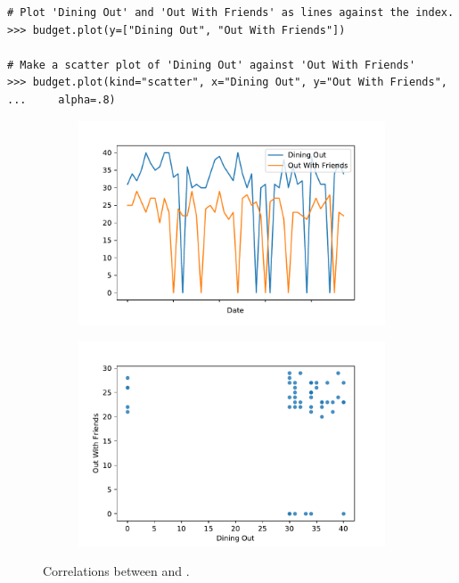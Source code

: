 \begin{lstlisting}
# Plot 'Dining Out' and 'Out With Friends' as lines against the index.
>>> budget.plot(y=["Dining Out", "Out With Friends"])

# Make a scatter plot of 'Dining Out' against 'Out With Friends'
>>> budget.plot(kind="scatter", x="Dining Out", y="Out With Friends", 
...		alpha=.8)
\end{lstlisting}

\begin{figure}[H] %
\captionsetup[subfigure]{justification=centering}
\centering
\begin{subfigure}{.49\textwidth}
    \includegraphics[width=\textwidth]{figures/line_compare.pdf}
\end{subfigure}
%
\begin{subfigure}{.49\textwidth}
    \includegraphics[width=\textwidth]{figures/scatter_compare.pdf}
\end{subfigure}
\caption{Correlations between  and .}
\end{figure}

